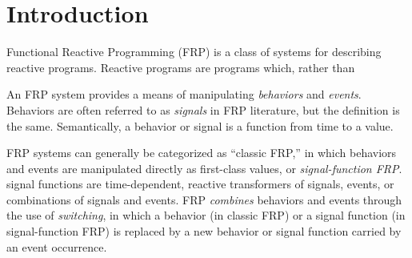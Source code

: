 \section{Introduction}
\label{section:Introduction}

Functional Reactive Programming (FRP) is a class of systems for describing
reactive programs. Reactive programs are programs which, rather than 

An FRP system provides a means of manipulating {\em behaviors} and
{\em events}. 
Behaviors are often referred to as {\em signals} in FRP literature,
but the definition is the same.  Semantically, a behavior or signal is a
function from time to a value.  



FRP systems can generally be categorized as ``classic FRP,'' 
in which behaviors
and events are manipulated directly as first-class values,
or {\em signal-function FRP}. 
signal functions are time-dependent,
reactive transformers of signals, events, or combinations of signals and events.
%
FRP {\em combines} behaviors and events through the use of {\em switching}, in which
a behavior (in classic FRP) or a signal function (in signal-function FRP) is
replaced by a new behavior or signal function carried by an event occurrence.


